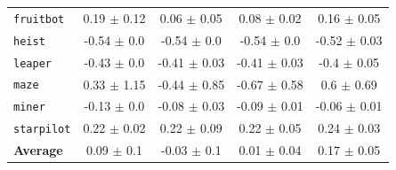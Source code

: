 \documentclass{article}
\begin{document}
\begin{table}[h]
\begin{tabular}{@{} l c c c c@{}}
    \texttt{fruitbot}           &                  0.19 $\pm$ 0.12 &                   0.06 $\pm$ 0.05 &                   0.08 $\pm$ 0.02 &             0.16 $\pm$ 0.05 \\
    \texttt{heist}              &                  -0.54 $\pm$ 0.0 &                   -0.54 $\pm$ 0.0 &                   -0.54 $\pm$ 0.0 &            -0.52 $\pm$ 0.03 \\
    \texttt{leaper}             &                  -0.43 $\pm$ 0.0 &                  -0.41 $\pm$ 0.03 &                  -0.41 $\pm$ 0.03 &             -0.4 $\pm$ 0.05 \\
    \texttt{maze}               &                  0.33 $\pm$ 1.15 &                  -0.44 $\pm$ 0.85 &                  -0.67 $\pm$ 0.58 &              0.6 $\pm$ 0.69 \\
    \texttt{miner}             &                  -0.13 $\pm$ 0.0 &                  -0.08 $\pm$ 0.03 &                  -0.09 $\pm$ 0.01 &            -0.06 $\pm$ 0.01 \\
    \texttt{starpilot}         &                  0.22 $\pm$ 0.02 &                   0.22 $\pm$ 0.09 &                   0.22 $\pm$ 0.05 &             0.24 $\pm$ 0.03 \\
    \textbf{Average}                  &                   0.09 $\pm$ 0.1 &                   -0.03 $\pm$ 0.1 &                   0.01 $\pm$ 0.04 &             0.17 $\pm$ 0.05 \\
    \bottomrule
\end{tabular}
\label{tab:procgen-train-eval}
\end{table}
\end{document}
